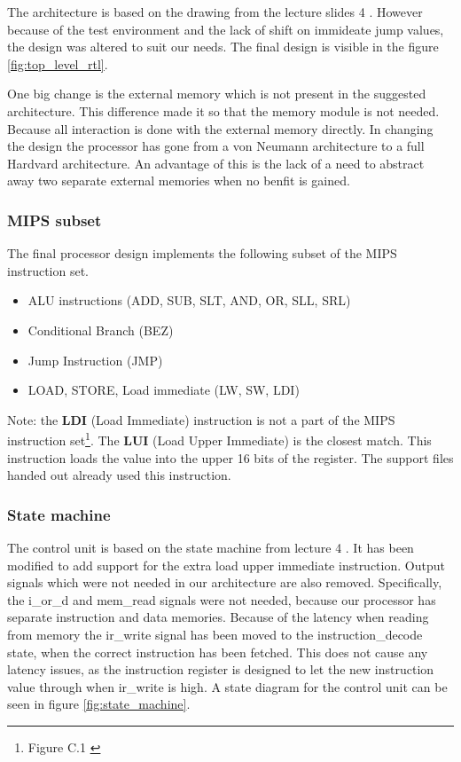 The architecture is based on the drawing from the lecture slides 4 \cite{lecture-4}.
However because of the test environment and the lack of shift on immideate jump values,
the design was altered to suit our needs.
The final design is visible in the figure \ref{fig:top_level_rtl}.

One big change is the external memory which is not present in the suggested architecture.
This difference made it so that the memory module is not needed.
Because all interaction is done with the external memory directly.
In changing the design the processor has gone from a von Neumann architecture to a full Hardvard architecture.
An advantage of this is the lack of a need to abstract away two separate external memories when no benfit is gained.

\subsubsection{MIPS subset}

The final processor design implements the following subset of the MIPS instruction set.

\begin{itemize}
    \item ALU instructions (ADD, SUB, SLT, AND, OR, SLL, SRL)
    \item Conditional Branch (BEZ)
    \item Jump Instruction (JMP)
    \item LOAD, STORE, Load immediate (LW, SW, LDI)
\end{itemize}

Note: the {\bf LDI} (Load Immediate) instruction is not a part of the MIPS instruction set\footnote{Figure C.1 \cite[p.66]{compendium}}.
The {\bf LUI} (Load Upper Immediate) is the closest match.
This instruction loads the value into the upper 16 bits of the register.
The support files handed out already used this instruction.

\subsubsection{State machine}

The control unit is based on the state machine from lecture 4 \cite{lecture-4}.
It has been modified to add support for the extra load upper immediate instruction.
Output signals which were not needed in our architecture are also removed.
Specifically, the i\_or\_d and mem\_read signals were not needed, because our processor has separate instruction and data memories.
Because of the latency when reading from memory the ir\_write signal has been moved to the instruction\_decode state, when the correct instruction has been fetched.
This does not cause any latency issues, as the instruction register is designed to let the new instruction value through when ir\_write is high.
A state diagram for the control unit can be seen in figure \ref{fig:state_machine}.

